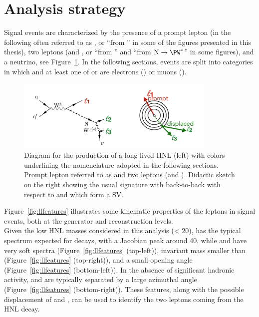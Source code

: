 \section{Analysis strategy}\label{sec:llanalisi}
Signal events are
characterized by the presence of a prompt lepton (in the following
often referred to as \lone, or ``\lept from \PW'' in some of the
figures presented in this thesis),
two \displ leptons (\ltwo and \lthree, or
``\lept from \hnl'' and ``\lept from $\hnl\to\PW^\ast$'' in some
figures), and a neutrino, see Figure~\ref{fig:c6llsketch}. In the following sections, events are split into  
categories in which \lone and at least one of \ltwo or \lthree are
electrons (\eex) or muons (\mmx).

\begin{figure}[h]
\centering
\includegraphics[width=0.85\textwidth]{Figures/c6/llsketch}
\caption{Diagram for the production of a long-lived HNL (left) with colors
  underlining the nomenclature adopted in the following
  sections. Prompt lepton referred to as \lone and two \displ leptons (\ltwo and \lthree). Didactic sketch on the right showing the usual signature with
 \lone back-to-back with respect to \ltwo and \lthree which form a SV.}
\label{fig:c6llsketch}
\end{figure}


Figure~\ref{fig:llfeatures} illustrates some
kinematic properties of the leptons in signal events, both at the
generator and reconstruction levels.\\
Given the low HNL masses considered in this analysis (\mhnl < 20\GeV),
\lone has the typical \pt spectrum expected for \PW decays, with a
Jacobian peak around 40\GeV,
while \ltwo and \lthree have very soft \pt spectra
(Figure~\ref{fig:llfeatures} (top-left)), invariant mass smaller than
\mhnl (Figure~\ref{fig:llfeatures} (top-right)), and a small opening angle
(Figure~\ref{fig:llfeatures} (bottom-left)).
In the absence of significant hadronic activity, \lone and \hnl are
typically separated by a large azimuthal angle
(Figure~\ref{fig:llfeatures} (bottom-right)).
These features, along with the possible displacement of \ltwo and
\lthree, can be used to identify the two leptons coming from the HNL
decay.

